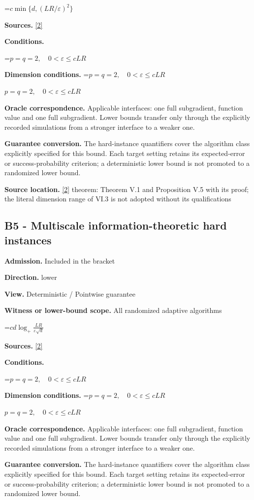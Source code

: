 \documentclass[10pt,a4paper]{article}
\newcommand{\AtlasMath}[1]{\par\begingroup\centering\setbox0=\hbox{$\displaystyle #1$}\ifdim\wd0>1.4\linewidth\typeout{ATLAS WIDE FORMULA: \the\wd0}\fi\ifdim\wd0>\linewidth\resizebox{\linewidth}{!}{\box0}\else\box0\fi\par\endgroup}
\newcommand{\AtlasInlineMath}[1]{\begingroup\setbox0=\hbox{$#1$}\ifdim\wd0>.4\linewidth\endgroup\AtlasMath{#1}\else\endgroup$#1$\fi}
\begin{document}
\AtlasMath{c\min\{d,(LR/\varepsilon)^2\}}
\textbf{Sources.} \href{https://arxiv.org/pdf/1407.5144}{[2]}

\textbf{Conditions.} 
\AtlasMath{p=q=2,\quad0<\varepsilon\le cLR}


\textbf{Dimension conditions.} \AtlasInlineMath{p=q=2,\quad0<\varepsilon\le cLR}

\textbf{Oracle correspondence.} Applicable interfaces: one full subgradient, function value and one full subgradient. Lower bounds transfer only through the explicitly recorded simulations from a stronger interface to a weaker one.

\textbf{Guarantee conversion.} The hard-instance quantifiers cover the algorithm class explicitly specified for this bound. Each target setting retains its expected-error or success-probability criterion; a deterministic lower bound is not promoted to a randomized lower bound.

\textbf{Source location.} \href{https://arxiv.org/pdf/1407.5144}{[2]} theorem: Theorem V.1 and Proposition V.5 with its proof; the literal dimension range of VI.3 is not adopted without its qualifications

\subsection{B5 - Multiscale information-theoretic hard instances}
\textbf{Admission.} Included in the bracket

\textbf{Direction.} lower

\textbf{View.} Deterministic / Pointwise guarantee

\textbf{Witness or lower-bound scope.} All randomized adaptive algorithms

\AtlasMath{c d\log_+\frac{LR}{\varepsilon\sqrt d}}
\textbf{Sources.} \href{https://arxiv.org/pdf/1407.5144}{[2]}

\textbf{Conditions.} 
\AtlasMath{p=q=2,\quad0<\varepsilon\le cLR}


\textbf{Dimension conditions.} \AtlasInlineMath{p=q=2,\quad0<\varepsilon\le cLR}

\textbf{Oracle correspondence.} Applicable interfaces: one full subgradient, function value and one full subgradient. Lower bounds transfer only through the explicitly recorded simulations from a stronger interface to a weaker one.

\textbf{Guarantee conversion.} The hard-instance quantifiers cover the algorithm class explicitly specified for this bound. Each target setting retains its expected-error or success-probability criterion; a deterministic lower bound is not promoted to a randomized lower bound.
\end{document}
